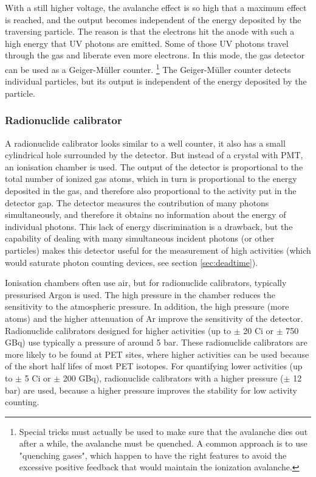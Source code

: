 \documentclass[11pt,oneside]{article}
\begin{document}
With a still higher voltage, the avalanche effect is so high that
a maximum effect is reached, and the output becomes independent of the
energy deposited by the traversing particle. The reason is that the
electrons hit the anode with such a high energy that UV photons are
emitted. Some of those UV photons travel through the gas and liberate
even more electrons. In this mode, the gas detector
can  be used as a Geiger-M\"uller counter.
%
\footnote{Special tricks must actually be used
to make sure that the avalanche dies out after a while, 
the avalanche must be quenched. A common approach is to
use "quenching gases", which happen to have the right features
to avoid the excessive positive feedback that would maintain the
ionization avalanche.}
%
The Geiger-M\"uller counter detects individual particles, but its
output is independent of the energy deposited by the particle.


\subsubsection{Radionuclide calibrator}
A radionuclide calibrator looks similar to a well counter, it also has a small
cylindrical hole surrounded by the detector. But instead of a crystal
with PMT, an ionisation chamber is used.
%
The output of the detector is proportional to the total number of
ionized gas atoms, which in turn is proportional to the energy
deposited in the gas, and therefore also proportional to the activity
put in the detector gap. The detector measures the contribution of
many photons simultaneously, and therefore it obtains no information
about the energy of individual photons. This lack of energy
discrimination is a drawback, but the capability of dealing with many
simultaneous incident photons (or other particles) makes this detector
useful for the measurement of high activities (which would saturate
photon counting devices, see section \ref{sec:deadtime}).

Ionisation chambers often use air, but for radionuclide calibrators, typically
pressurised Argon is used. The high pressure in the chamber reduces
the sensitivity to the atmospheric pressure. In addition, the high
pressure (more atoms) and the higher attenuation of Ar improve the
sensitivity of the detector. Radionuclide calibrators designed for higher
activities (up to $\pm$ 20 Ci or $\pm$ 750 GBq) use typically a
pressure of around 5 bar. These radionuclide calibrators are more likely to be
found at PET sites, where higher activities can be used because of the
short half lifes of most PET isotopes. For quantifying lower
activities (up to $\pm$ 5 Ci or $\pm$ 200 GBq), radionuclide calibrators with
a higher pressure ($\pm$ 12 bar) are used, because a higher pressure
improves the stability for low activity counting.
\end{document}
